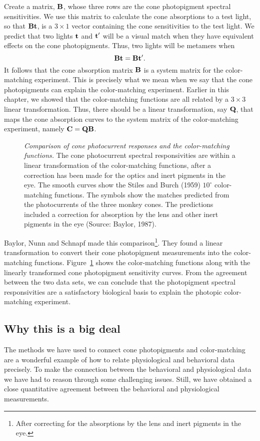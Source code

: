 Create a matrix, $\mbox{$\bf B$}$, whose three rows are the
cone photopigment spectral sensitivities.
We use this matrix to calculate the cone absorptions
to a test light, so that $\mbox{$\bf B$} \mbox{${\bf t}$}$,
is a $3 \times 1$ vector
containing the cone sensitivities to the test light.
We predict that
two lights $\mbox{${\bf t}$}$ and $\mbox{${\bf t}$} '$ will be a visual match
when they have equivalent effects on the cone photopigments.
Thus, two lights will be metamers when
\[
\mbox{$\bf B$} \mbox{${\bf t}$} = \mbox{$\bf B$} \mbox{${\bf t}$}' .
\]
It follows that the cone absorption matrix $\mbox{$\bf B$}$
is a system matrix for the color-matching experiment.
This is precisely what we mean when we say that the
cone photopigments can explain the color-matching experiment.
Earlier in this chapter, we showed that
the color-matching functions are all related
by a $ 3 \times 3$ linear transformation.
Thus, there should be a linear transformation, say $\bf Q$,
that maps the cone absorption curves
to the system matrix of the
color-matching experiment, namely
$\mbox{\bf C} = {\bf Q } \mbox{$\bf B$}$.

\begin{figure}
\centerline {
}
\caption[Color Matching and Photocurrent]{
{\em Comparison of cone photocurrent responses and the
color-matching functions.}
The cone photocurrent spectral responsivities
are within a linear transformation
of the color-matching functions, after a correction has been made
for the optics and inert pigments in the eye.
The smooth curves show the Stiles and Burch (1959)
$10^\circ$ color-matching functions.
The symbols show the matches predicted from the photocurrents
of the three monkey cones.
The predictions included a correction for absorption by the
lens and other inert pigments in the eye (Source:  Baylor, 1987).
}
\label{f3:cone.to.cie}
\end{figure}
Baylor, Nunn and Schnapf made this comparison\footnote{
After correcting for the absorptions by the lens and
inert pigments in the eye.}.
They found a linear transformation to convert
their cone photopigment measurements into the color-matching functions.
Figure~\ref{f3:cone.to.cie} shows
the color-matching functions along with
the linearly transformed cone photopigment sensitivity curves.
From the agreement between the two data sets,
we can conclude that the photopigment spectral responsivities
are a satisfactory biological basis
to explain the photopic color-matching experiment.

\subsection*{Why this is a big deal}
The methods we have
used to connect cone photopigments
and color-matching are a wonderful example
of how to relate
physiological and behavioral data precisely.
To make the connection between the behavioral
and physiological data we have had to reason
through some challenging issues.
Still, we have obtained a close quantitative agreement
between the behavioral and physiological measurements.

